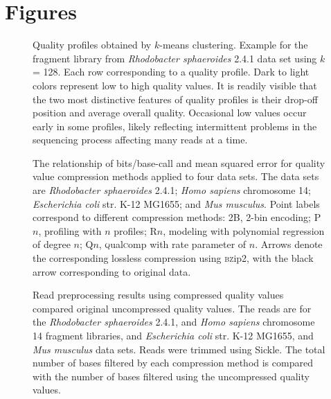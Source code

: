 \documentclass[fleqn,10pt,lineno]{wlpeerj} %
\begin{document}


\section*{Figures}
\begin{figure}[h!]
\caption{Quality profiles obtained by $k$-means
    clustering. Example for the fragment library from
  \textit{Rhodobacter sphaeroides} 2.4.1 data set using $k$ =
  128. Each row corresponding to a quality profile. Dark to light
  colors represent low to high quality values. It is readily visible
  that the two most distinctive features of quality profiles is their
  drop-off position and average overall quality. Occasional low values
  occur early in some profiles, likely reflecting intermittent
  problems in the sequencing process affecting many reads at a time.}
  \label{fig:profiles_128}
\end{figure}

\begin{figure*}[h!]
\caption{The relationship of bits/base-call and mean
    squared error for quality value compression methods applied to
    four data sets. The data sets are \textit{Rhodobacter
    sphaeroides} 2.4.1; \textit{Homo sapiens} chromosome 14;
  \textit{Escherichia coli} str. K-12 MG1655; and \textit{Mus
    musculus}. Point labels correspond to different compression
  methods: 2B, 2-bin encoding; P$n$, profiling with $n$ profiles;
  R$n$, modeling with polynomial regression of degree $n$; Q$n$,
  \textsc{q}ual\textsc{c}omp with rate parameter of $n$. Arrows denote
  the corresponding lossless compression using \textsc{bz}ip2, with
  the black arrow corresponding to original data.}
\label{fig:mse_vs_bpbp}
\end{figure*}

\begin{figure}[h!]
\caption{Read preprocessing results using compressed
    quality values compared original uncompressed quality values.
  The reads are for the \textit{Rhodobacter sphaeroides} 2.4.1, and
  \textit{Homo sapiens} chromosome 14 fragment libraries, and
  \textit{Escherichia coli} str. K-12 MG1655, and \textit{Mus
    musculus} data sets. Reads were trimmed using Sickle. The total
  number of bases filtered by each compression method is compared with
  the number of bases filtered using the uncompressed quality values.}
  \label{fig:preprocessing}
\end{figure}
\end{document}
